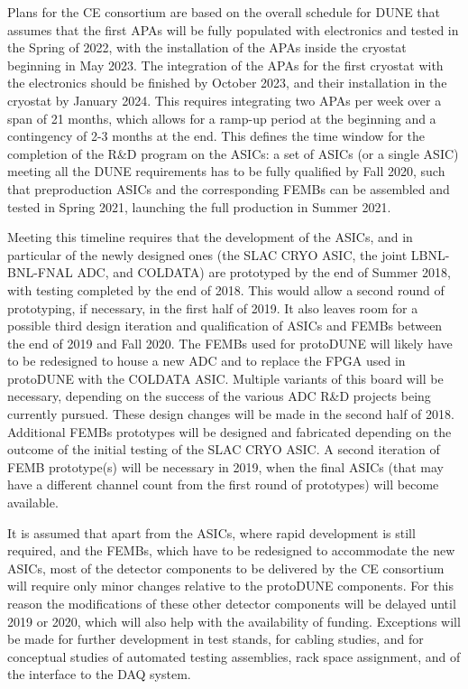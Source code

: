 Plans for the CE consortium are based on the overall schedule for DUNE
that assumes that the first APAs will be fully populated with electronics
and tested in the Spring of 2022, with the installation of
the APAs inside the cryostat beginning in May 2023. The integration of the
APAs for the first cryostat with the electronics should be finished by
October 2023, and their installation in the cryostat by January 2024.
This requires integrating two APAs per week over a span of 21 months,
which allows for a ramp-up period at the beginning and a contingency of
2-3 months at the end. This defines the time window for the completion of
the R\&D program on the ASICs: a set of ASICs (or a single ASIC) meeting
all the DUNE requirements has to be fully qualified by Fall 2020, such
that preproduction ASICs and the corresponding FEMBs can be assembled and
tested in Spring 2021, launching the full production in Summer 2021.

Meeting this timeline requires that the development of the ASICs, and in particular
of the newly designed ones (the SLAC CRYO ASIC, the joint LBNL-BNL-FNAL ADC,
and COLDATA) are prototyped by the end of Summer 2018, with testing
completed by the end of 2018. This would allow a second round of prototyping,
if necessary, in the first half of 2019. It also leaves room for a possible
third design iteration and qualification of ASICs and FEMBs between the
end of 2019 and Fall 2020. The FEMBs used for protoDUNE will
likely have to be redesigned to house a new ADC and to replace the FPGA used
in protoDUNE with the COLDATA ASIC. Multiple variants of this board will be
necessary, depending on the success of the various ADC R\&D projects being currently
pursued. These design changes will be made in the second half of 2018.
Additional FEMBs prototypes will be designed and fabricated depending on
the outcome of the initial testing of the SLAC CRYO ASIC. A second iteration
of FEMB prototype(s) will be necessary in 2019, when the final ASICs (that
may have a different channel count from the first round of prototypes) will become
available.

It is assumed that apart from the ASICs, where rapid development is still
required, and the FEMBs, which have to be redesigned to accommodate the
new ASICs, most of the detector components to be delivered by the CE consortium
will require only minor changes relative to the protoDUNE components. For
this reason the modifications of these other detector components will
be delayed until 2019 or 2020, which will also help with the availability of funding.
Exceptions will be made for further development in test stands, for cabling
studies, and for conceptual studies of automated testing assemblies, rack space
assignment, and of the interface to the DAQ system.
